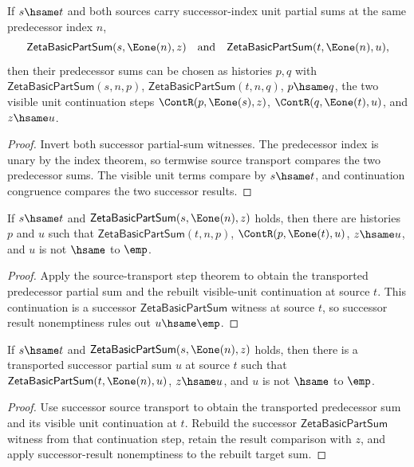 \begin{theorem}
\label{thm:zeta-basic-part-sum-successor-source-hsame-previous-deterministic}
If $s\hsame t$ and both sources carry successor-index unit partial sums
at the same predecessor index $n$,
$$
\mathsf{ZetaBasicPartSum}(s,\Eone(n),z)
\quad\text{and}\quad
\mathsf{ZetaBasicPartSum}(t,\Eone(n),u),
$$
then their predecessor sums can be chosen as histories $p,q$ with
\(\mathsf{ZetaBasicPartSum}(s,n,p)\), \(\mathsf{ZetaBasicPartSum}(t,n,q)\),
$p\hsame q$, the two visible unit continuation steps
\(\ContR(p,\Eone(s),z)\), \(\ContR(q,\Eone(t),u)\), and $z\hsame u$.
\end{theorem}
\begin{proof}
Invert both successor partial-sum witnesses. The predecessor index is unary
by the index theorem, so termwise source transport compares the two
predecessor sums. The visible unit terms compare by $s\hsame t$, and
continuation congruence compares the two successor results.
\end{proof}

\begin{theorem}
\label{thm:zeta-basic-part-sum-successor-source-transport-result-nonempty}
If \(s\hsame t\) and \(\mathsf{ZetaBasicPartSum}(s,\Eone(n),z)\) holds,
then there are histories \(p\) and \(u\) such that
\(\mathsf{ZetaBasicPartSum}(t,n,p)\), \(\ContR(p,\Eone(t),u)\),
\(z\hsame u\), and \(u\) is not \(\hsame\) to \(\emp\).
\end{theorem}
\begin{proof}
Apply the source-transport step theorem to obtain the transported predecessor
partial sum and the rebuilt visible-unit continuation at source \(t\). This
continuation is a successor \(\mathsf{ZetaBasicPartSum}\) witness at source
\(t\), so successor result nonemptiness rules out \(u\hsame\emp\).
\end{proof}

\begin{theorem}
\label{thm:zeta-basic-part-sum-successor-source-result-nonempty-transport}
If \(s\hsame t\) and \(\mathsf{ZetaBasicPartSum}(s,\Eone(n),z)\) holds,
then there is a transported successor partial sum \(u\) at source \(t\) such
that \(\mathsf{ZetaBasicPartSum}(t,\Eone(n),u)\), \(z\hsame u\), and \(u\)
is not \(\hsame\) to \(\emp\).
\end{theorem}
\begin{proof}
Use successor source transport to obtain the transported predecessor sum and
its visible unit continuation at \(t\). Rebuild the successor
\(\mathsf{ZetaBasicPartSum}\) witness from that continuation step, retain the
  result comparison with \(z\), and apply successor-result nonemptiness to the
rebuilt target sum.
\end{proof}

